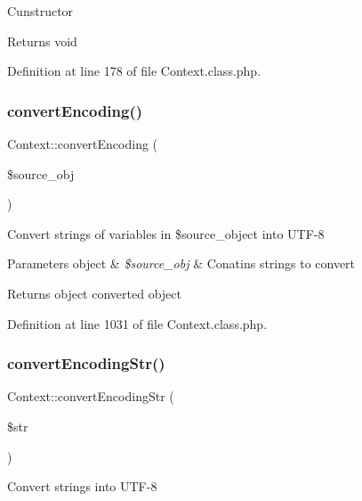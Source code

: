 Cunstructor

\begin{DoxyReturn}{Returns}
void 
\end{DoxyReturn}


Definition at line 178 of file Context.\+class.\+php.

\mbox{\label{classContext_a9ef4f41a9ae7108ea7560162399c77a8}} 
\subsubsection{\texorpdfstring{convert\+Encoding()}{convertEncoding()}}
{\footnotesize\ttfamily Context\+::convert\+Encoding (\begin{DoxyParamCaption}\item[{}]{\$source\+\_\+obj }\end{DoxyParamCaption})}

Convert strings of variables in \$source\+\_\+object into U\+T\+F-\/8


\begin{DoxyParams}[1]{Parameters}
object & {\em \$source\+\_\+obj} & Conatins strings to convert \\
\hline
\end{DoxyParams}
\begin{DoxyReturn}{Returns}
object converted object 
\end{DoxyReturn}


Definition at line 1031 of file Context.\+class.\+php.

\mbox{\label{classContext_a0464dcbadfd67f62265fac90546d3bf8}} 
\subsubsection{\texorpdfstring{convert\+Encoding\+Str()}{convertEncodingStr()}}
{\footnotesize\ttfamily Context\+::convert\+Encoding\+Str (\begin{DoxyParamCaption}\item[{}]{\$str }\end{DoxyParamCaption})}

Convert strings into U\+T\+F-\/8


